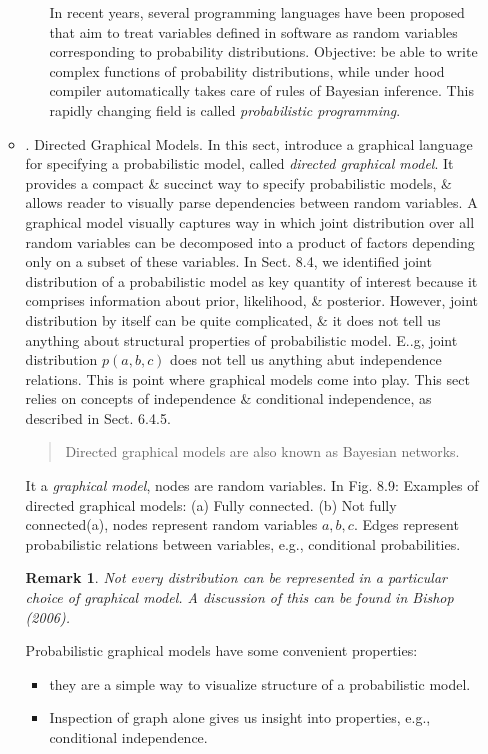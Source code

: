 \documentclass{article}
\newtheorem{remark}{Remark}
\begin{document}
\begin{itemize}
\begin{itemize}
\begin{itemize}
			In recent years, several programming languages have been proposed that aim to treat variables defined in software as random variables corresponding to probability distributions. Objective: be able to write complex functions of probability distributions, while under hood compiler automatically takes care of rules of Bayesian inference. This rapidly changing field is called {\it probabilistic programming}.
		\end{itemize}
		\item {. Directed Graphical Models.} In this sect, introduce a graphical language for specifying a probabilistic model, called {\it directed graphical model}. It provides a compact \& succinct way to specify probabilistic models, \& allows reader to visually parse dependencies between random variables. A graphical model visually captures way in which joint distribution over all random variables can be decomposed into a product of factors depending only on a subset of these variables. In Sect. 8.4, we identified joint distribution of a probabilistic model as key quantity of interest because it comprises information about prior, likelihood, \& posterior. However, joint distribution by itself can be quite complicated, \& it does not tell us anything about structural properties of probabilistic model. E..g, joint distribution $p(a,b,c)$ does not tell us anything abut independence relations. This is point where graphical models come into play. This sect relies on concepts of independence \& conditional independence, as described in Sect. 6.4.5.		
		\begin{quote}
			Directed graphical models are also known as Bayesian networks.
		\end{quote}
		It a {\it graphical model}, nodes are random variables. In {\sf Fig. 8.9: Examples of directed graphical models: (a) Fully connected. (b) Not fully connected}(a), nodes represent random variables $a,b,c$. Edges represent probabilistic relations between variables, e.g., conditional probabilities.
		\begin{remark}
			Not every distribution can be represented in a particular choice of graphical model. A discussion of this can be found in Bishop (2006).
		\end{remark}
		Probabilistic graphical models have some convenient properties:
		\begin{itemize}
			\item they are a simple way to visualize structure of a probabilistic model.
			\item Inspection of graph alone gives us insight into properties, e.g., conditional independence.

\end{itemize}
\end{itemize}
\end{itemize}
\end{document}
